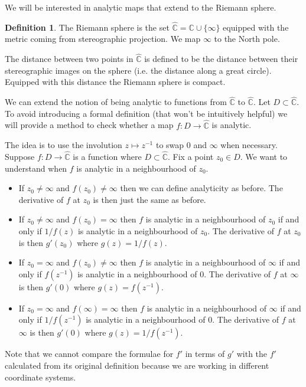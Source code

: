 \documentclass[12pt]{article}
\theoremstyle{definition}
\newtheorem{definition}[theorem]{Definition}
\theoremstyle{remark}
\begin{document}
We will be interested in analytic maps that extend to the Riemann sphere.
\begin{definition}
The Riemann sphere is the set $\widehat{\mathbb{C}} = \mathbb{C} \cup \{ \infty\}$ equipped with the metric coming from stereographic projection. We map $\infty$ to the North pole.
\end{definition}
The distance between two points in $\widehat{\mathbb{C}}$ is defined to be the distance between their stereographic images on the sphere (i.e. the distance along a great circle). Equipped with this distance the Riemann sphere is compact.

We can extend the notion of being analytic to functions from $\widehat{\mathbb{C}}$ to $\widehat{\mathbb{C}}$. Let $D \subset \widehat{\mathbb{C}}$. To avoid introducing a formal definition (that won't be intuitively helpful) we will provide a method to check whether a map $f: D \to \widehat{\mathbb{C}}$
is analytic. 

The idea is to use the involution $z \mapsto z^{-1}$ to swap $0$ and $\infty$ when necessary.
Suppose $f: D \to \widehat{\mathbb{C}}$ is a function where $D \subset \widehat{\mathbb{C}}$. Fix a point $z_0 \in D$. We want to understand when $f$ is analytic in a neighbourhood of $z_0$.

\begin{itemize}
\item
If $z_0 \neq \infty$ and $f(z_0) \neq \infty$ then we can define analyticity as before. The derivative of $f$ at $z_0$ is then just the same as before.
\item
If $z_0 \neq \infty$ and $f(z_0) = \infty$ then $f$ is analytic in a neighbourhood of $z_0$ if and only if $1/f(z)$ is analytic in a neighbourhood of $z_0$. The derivative of $f$ at $z_0$ is then $g'(z_0)$ where $g(z) = 1/f(z)$.
\item
If $z_0 = \infty$ and $f(z_0) \neq \infty$ then  $f$ is analytic in a neighbourhood of $\infty$ if and only if $f(z^{-1})$ is analytic in a neighbourhood of $0$. The derivative of $f$ at $\infty$ is then $g'(0)$ where $g(z) = f(z^{-1})$.
\item
If $z_0 = \infty$ and $f(\infty) = \infty$ then $f$ is analytic in a neighbourhood of $\infty$ if and only if $1/f(z^{-1})$ is analytic in a neighbourhood of $0$. The derivative of $f$ at $\infty$ is then $g'(0)$ where $g(z) = 1/f(z^{-1})$.
\end{itemize}
Note that we cannot compare the formulae for $f'$ in terms of $g'$ with the $f'$ calculated from its original definition because we are working in different coordinate systems.\\
\end{document}
